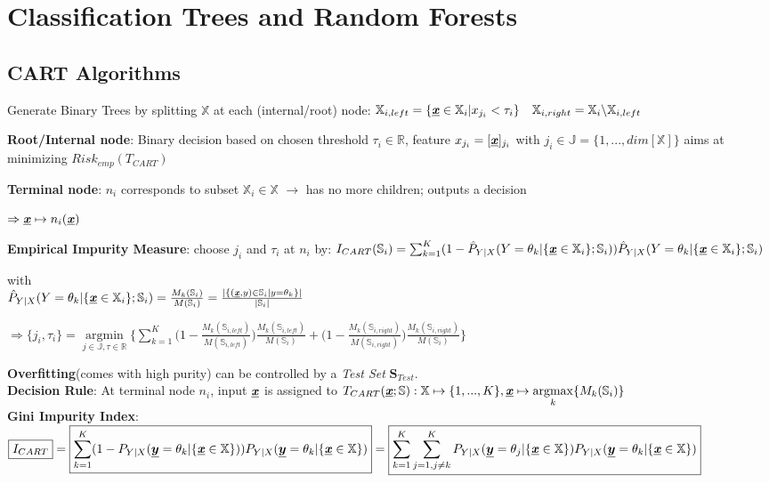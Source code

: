 \section{Classification Trees and Random Forests}

\begin{sectionbox}
	\subsection{CART Algorithms}
	Generate Binary Trees by splitting $\mathbb X$ at each (internal/root) node: $\mathbb{X}_{i,left}=\{\underline{\textbf{\textit{x}}}\in\mathbb{X}_i|x_{j_i}<\tau_i\}\quad\mathbb{X}_{i,right}=\mathbb{X}_i\backslash\mathbb{X}_{i,left}$
	
	\textbf{Root/Internal node}: Binary decision based on chosen threshold $\tau_i\in\mathbb{R}$, feature $x_{j_i}=[\underline{\textbf{\textit{x}}}]_{j_i}$ with $j_i\in\mathbb{J}=\{1,...,dim[\mathbb{X}]\}$ aims at minimizing $Risk_{emp}(T_{CART})$
	
	\textbf{Terminal node}: $n_i$ corresponds to subset $\mathbb{X}_i\in\mathbb{X}$ $\rightarrow$ has no more children; outputs a decision
	
	$\Rightarrow \underline{\textbf{\textit{x}}}\mapsto n_i(\underline{\textbf{\textit{x}}})$  
	
	\textbf{Empirical Impurity Measure}: choose $j_i$ and $\tau_i$ at $n_i$ by:
	$I_{CART}(\mathbb{S}_i)=\sum_{k=1}^{K}(1-\hat{P}_{Y|X}(Y=\theta_k|\{\underline{\textbf{\textit{x}}}\in\mathbb{X}_i\};\mathbb{S}_i))\hat{P}_{Y|X}(Y=\theta_k|\{\underline{\textbf{\textit{x}}}\in\mathbb{X}_i\};\mathbb{S}_i)$
	
	with\\ $\hat{P}_{Y|X}(Y=\theta_k|\{\underline{\textbf{\textit{x}}}\in\mathbb{X}_i\};\mathbb{S}_i)=\frac{M_k(\mathbb{S}_i)}{M(\mathbb{S}_i)}=\frac{|\{(\underline{\textbf{\textit{x}}},y)\in\mathbb{S}_i|y=\theta_k\}|}{|\mathbb{S}_i|}$
	
	$\Rightarrow \{j_i,\tau_i\}=\underset{j\in\mathbb{J},\tau\in\mathbb{R}}{\operatorname{argmin}}\Big\{\sum_{k=1}^{K}\Big(1-\frac{M_k(\mathbb{S}_{i,left})}{M(\mathbb{S}_{i,left})}\Big)\frac{M_k(\mathbb{S}_{i,left})}{M(\mathbb{S}_{i})}+\Big(1-\frac{M_k(\mathbb{S}_{i,right})}{M(\mathbb{S}_{i,right})}\Big)\frac{M_k(\mathbb{S}_{i,right})}{M(\mathbb{S}_{i})}\Big\}$
	
	\textbf{Overfitting}(comes with high purity) can be controlled by a \textit{Test Set} $\mathbf{S}_{Test}$.\\
	\textbf{Decision Rule}: At terminal node $n_i$, input $\underline{\textbf{\textit{x}}}$ is assigned to $T_{CART}(\underline{\textbf{\textit{x}}};\mathbb{S}):\mathbb{X}\mapsto \{1,...,K\}, \underline{\textbf{\textit{x}}}\mapsto \underset{k}{\operatorname{argmax}}\{M_k(\mathbb{S}_i)\}$\\
	
	\textbf{Gini Impurity Index}: $\boxed{I_{CART}}=\\\boxed{\sum_{k=1}^{K}(1-P_{Y|X}(\underline{\boldsymbol{y}}=\theta_k|\{\underline{\textbf{\textit{x}}}\in\mathbb{X}\}))P_{Y|X}(\underline{\boldsymbol{y}}=\theta_k|\{\underline{\textbf{\textit{x}}}\in\mathbb{X}\})}
	=\boxed{\sum_{k=1}^{K}\sum_{j=1,j\neq k}^{K}P_{Y|X}(\underline{\boldsymbol{y}}=\theta_j|\{\underline{\textbf{\textit{x}}}\in\mathbb{X}\})P_{Y|X}(\underline{\boldsymbol{y}}=\theta_k|\{\underline{\textbf{\textit{x}}}\in\mathbb{X}\})}$
	
	
\end{sectionbox}

